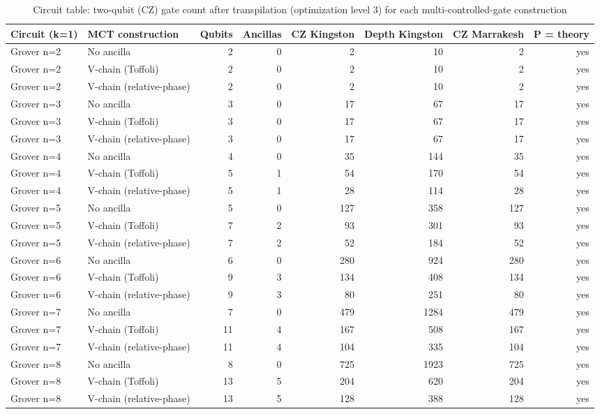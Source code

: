 \begin{table}[t]
\centering
\small
\caption{Circuit table: two-qubit (CZ) gate count after transpilation (optimization level 3) for each multi-controlled-gate construction}
\label{tab:circuits}
\begin{tabular}{llrrrrrr}
\toprule
Circuit (k=1) & MCT construction & Qubits & Ancillas & CZ Kingston & Depth Kingston & CZ Marrakesh & P = theory \\
\midrule
Grover n=2 & No ancilla & 2 & 0 & 2 & 10 & 2 & yes \\
Grover n=2 & V-chain (Toffoli) & 2 & 0 & 2 & 10 & 2 & yes \\
Grover n=2 & V-chain (relative-phase) & 2 & 0 & 2 & 10 & 2 & yes \\
Grover n=3 & No ancilla & 3 & 0 & 17 & 67 & 17 & yes \\
Grover n=3 & V-chain (Toffoli) & 3 & 0 & 17 & 67 & 17 & yes \\
Grover n=3 & V-chain (relative-phase) & 3 & 0 & 17 & 67 & 17 & yes \\
Grover n=4 & No ancilla & 4 & 0 & 35 & 144 & 35 & yes \\
Grover n=4 & V-chain (Toffoli) & 5 & 1 & 54 & 170 & 54 & yes \\
Grover n=4 & V-chain (relative-phase) & 5 & 1 & 28 & 114 & 28 & yes \\
Grover n=5 & No ancilla & 5 & 0 & 127 & 358 & 127 & yes \\
Grover n=5 & V-chain (Toffoli) & 7 & 2 & 93 & 301 & 93 & yes \\
Grover n=5 & V-chain (relative-phase) & 7 & 2 & 52 & 184 & 52 & yes \\
Grover n=6 & No ancilla & 6 & 0 & 280 & 924 & 280 & yes \\
Grover n=6 & V-chain (Toffoli) & 9 & 3 & 134 & 408 & 134 & yes \\
Grover n=6 & V-chain (relative-phase) & 9 & 3 & 80 & 251 & 80 & yes \\
Grover n=7 & No ancilla & 7 & 0 & 479 & 1284 & 479 & yes \\
Grover n=7 & V-chain (Toffoli) & 11 & 4 & 167 & 508 & 167 & yes \\
Grover n=7 & V-chain (relative-phase) & 11 & 4 & 104 & 335 & 104 & yes \\
Grover n=8 & No ancilla & 8 & 0 & 725 & 1923 & 725 & yes \\
Grover n=8 & V-chain (Toffoli) & 13 & 5 & 204 & 620 & 204 & yes \\
Grover n=8 & V-chain (relative-phase) & 13 & 5 & 128 & 388 & 128 & yes \\

\end{tabular}
\end{table}
